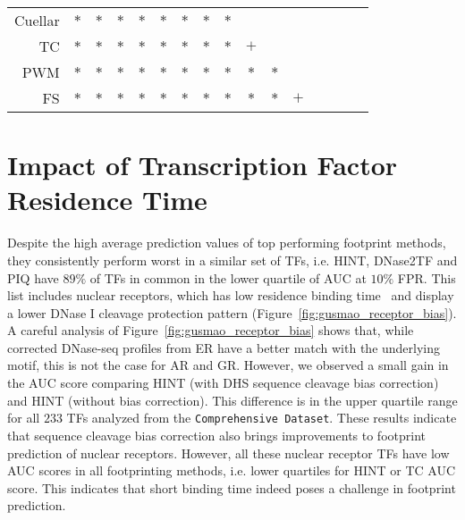 \begin{table}[h!]
\begin{center}
\begin{tabular}{ rcHcHcHcHcHcHcHc }
    Cuellar & $*$ & $*$ & $*$ & $*$ & $*$ & $*$ & $*$ & $*$ &   &  &     &     &     &     \\
    TC & $*$ & $*$ & $*$ & $*$ & $*$ & $*$ & $*$ & $*$ & $+$  &    &     &     &     &     \\
    PWM & $*$ & $*$ & $*$ & $*$ & $*$ & $*$ & $*$ & $*$ & $*$ & $*$ &     &     &     &     \\
    FS & $*$ & $*$ & $*$ & $*$ & $*$ & $*$ & $*$ & $*$ & $*$ & $*$ & $+$ &     &     &     \\
    \hline
  \end{tabular}
\end{center}
\vspace{0.0cm}
\end{table}

\section{Impact of Transcription Factor Residence Time}
\label{sec:impact.tf.residence.time}

Despite the high average prediction values of top performing footprint methods, they consistently perform worst in a similar set of TFs, i.e. HINT, DNase2TF and PIQ have $89\%$ of TFs in common in the lower quartile of AUC at $10\%$ FPR. This list includes nuclear receptors, which has low residence binding time~\citep{sung2014} and display a lower DNase I cleavage protection pattern (Figure~\ref{fig:gusmao_receptor_bias}). A careful analysis of Figure~\ref{fig:gusmao_receptor_bias} shows that, while corrected DNase-seq profiles from ER have a better match with the underlying motif, this is not the case for AR and GR. However, we observed a small gain in the AUC score comparing HINT (with DHS sequence cleavage bias correction) and HINT (without bias correction). This difference is in the upper quartile range for all $233$ TFs analyzed from the {\tt Comprehensive Dataset}. These results indicate that sequence cleavage bias correction also brings improvements to footprint prediction of nuclear receptors. However, all these nuclear receptor TFs have low AUC scores in all footprinting methods, i.e. lower quartiles for HINT or TC AUC score. This indicates that short binding time indeed poses a challenge in footprint prediction.

